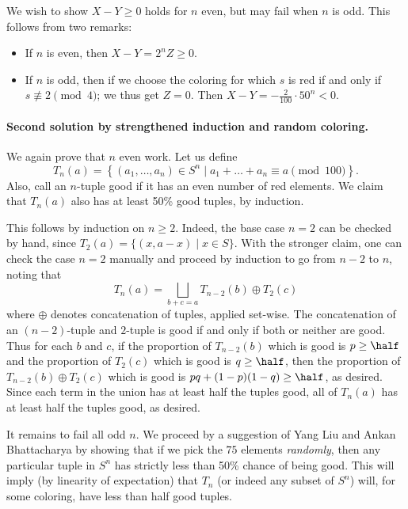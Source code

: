 \documentclass[11pt]{scrartcl}
\begin{document}
We wish to show $X-Y \ge 0$ holds for $n$ even,
but may fail when $n$ is odd.
This follows from two remarks:
\begin{itemize}
  \item If $n$ is even, then $X-Y = 2^n Z \ge 0$.
  \item If $n$ is odd,
  then if we choose the coloring for which
  $s$ is red if and only if $s \not\equiv 2 \pmod 4$;
  we thus get $Z = 0$.
  Then $X-Y = -\frac 2{100} \cdot 50^n < 0$.
\end{itemize}

\paragraph{Second solution by strengthened induction and random coloring.}
We again prove that $n$ even work.
Let us define
\[
  T_n(a) = \left\{ (a_1, \dots, a_n) \in S^n
    \mid a_1 + \dots + a_n \equiv a \pmod{100} \right\}.
\]
Also, call an $n$-tuple good if it has an even number of red elements.
We claim that $T_n(a)$ also has at least 50\% good tuples, by induction.

This follows by induction on $n \ge 2$.
Indeed, the base case $n = 2$ can be checked by hand,
since $T_2(a) = \{ (x, a-x) \mid x \in S \}$.
With the stronger claim, one can check the case $n=2$ manually
and proceed by induction to go from $n-2$ to $n$, noting that
\[ T_{n}(a) =
  \bigsqcup_{b+c=a} T_{n-2}(b) \oplus T_2(c) \]
where $\oplus$ denotes concatenation of tuples, applied set-wise.
The concatenation of an $(n-2)$-tuple and $2$-tuple is good
if and only if both or neither are good.
Thus for each $b$ and $c$,
if the proportion of $T_{n-2}(b)$ which is good is $p \ge \half$
and the proportion of $T_2(c)$ which is good is $q \ge \half$,
then the proportion of $T_{n-2}(b) \oplus T_2(c)$ which is good
is $pq + (1-p)(1-q) \ge \half$, as desired.
Since each term in the union has at least half the tuples good,
all of $T_n(a)$ has at least half the tuples good, as desired.

It remains to fail all odd $n$.
We proceed by a suggestion of Yang Liu and Ankan Bhattacharya
by showing that if we pick the $75$ elements \emph{randomly},
then any particular tuple in $S^n$ has strictly less than 50\% chance of being good.
This will imply (by linearity of expectation)
that $T_n$ (or indeed any subset of $S^n$) will, for some coloring,
have less than half good tuples.
\end{document}
